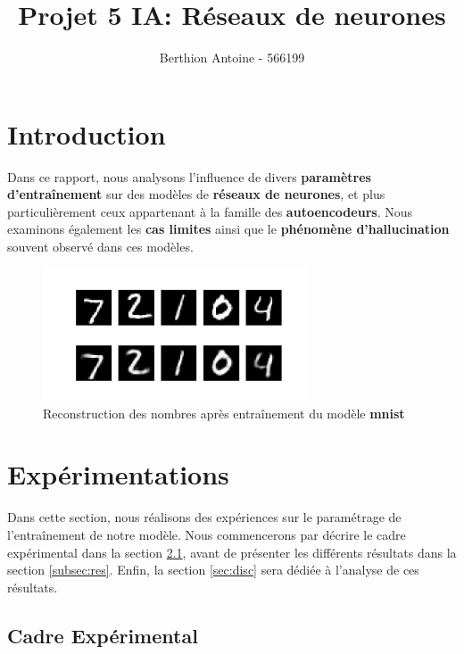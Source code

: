 \documentclass{article}
\title{Projet 5 IA: Réseaux de neurones}
\author{Berthion Antoine - 566199}
\begin{document}
\maketitle

\section{Introduction}

\noindent Dans ce rapport, nous analysons l'influence de divers \textbf{paramètres d'entraînement} sur des modèles de \textbf{réseaux de neurones}, et plus particulièrement ceux appartenant à la famille des \textbf{autoencodeurs}. Nous examinons également les \textbf{cas limites} ainsi que le \textbf{phénomène d'hallucination} souvent observé dans ces modèles.

\vspace{-1em}  %

\begin{figure}[H]
    \centering
    \includegraphics[width=0.7\textwidth]{src/intro.png}
    \caption{Reconstruction des nombres après entraînement du modèle \textbf{mnist}}
    \label{fig:intro}
\end{figure}


\section{Expérimentations}
\label{sec:exp}

\noindent Dans cette section, nous réalisons des expériences sur le paramétrage de l'entraînement de notre modèle. Nous commencerons par décrire le cadre expérimental dans la section \ref{subsec:cadre_exp}, avant de présenter les différents résultats dans la section \ref{subsec:res}. Enfin, la section \ref{sec:disc} sera dédiée à l'analyse de ces résultats.

\subsection{Cadre Expérimental}
\label{subsec:cadre_exp}
\end{document}
